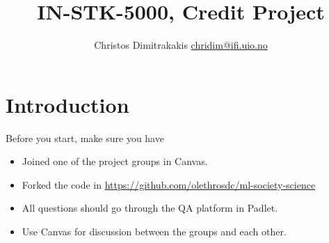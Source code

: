 \documentclass[a4paper,twoside]{article}
\title{IN-STK-5000, Credit Project}
\author{Christos Dimitrakakis \url{chridim@ifi.uio.no}}
\begin{document}
\maketitle
\section{Introduction}
Before you start, make sure you have
\begin{itemize}
\item Joined one of the project groups in Canvas.
\item Forked the code in \url{https://github.com/olethrosdc/ml-society-science}
\item All questions should go through the QA platform in Padlet.
\item Use Canvas for discussion between the groups and each other.
\end{itemize}


%
%
\end{document}
